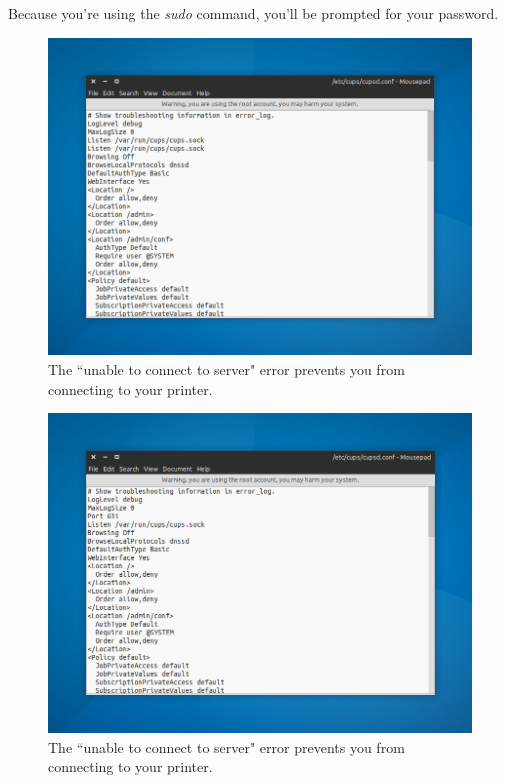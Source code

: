 \documentclass[12pt, a4paper]{article}
\begin{document}
\noindent Because you're using the \emph{sudo} command, you'll be prompted for your password.



\begin{figure}[!htp]
  \centering
  \includegraphics[width=1\textwidth]{imgs/unable-to-connect-to-server-3.png}
  \caption{The ``unable to connect to server" error prevents you from connecting to your printer.}
  \label{fig13}
\end{figure}




\begin{figure}[!htp]
  \centering
  \includegraphics[width=1\textwidth]{imgs/unable-to-connect-to-server-4.png}
  \caption{The ``unable to connect to server" error prevents you from connecting to your printer.}
  \label{fig14}
\end{figure}
\end{document}
